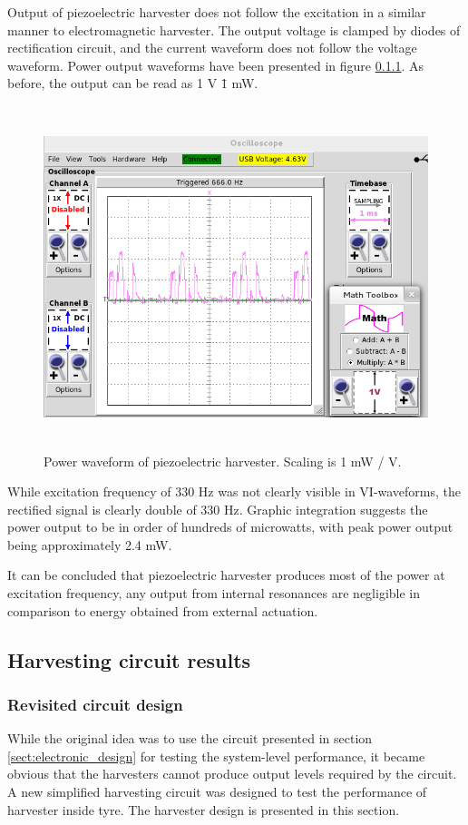 Output of piezoelectric harvester does not follow the excitation in a similar manner to electromagnetic harvester. The output voltage is clamped by diodes of rectification circuit, and the current waveform does not follow the voltage waveform. Power output waveforms have been presented in figure \ref{}. As before, the output can be read as 1 V \= 1 mW. 

\begin{figure}[htb]
\begin{center}
\includegraphics[height=10cm]{images/own_measurement/generator_shaker/piezo_td_power_330hz_2_3.png}
\end{center}
\caption{\label{fig:piezo_td_vi} Power waveform of piezoelectric harvester. Scaling is 1 mW / V.}
\end{figure}

While excitation frequency of 330 Hz was not clearly visible in VI-waveforms, the rectified signal is clearly double of 330 Hz. Graphic integration suggests the power output to be in order of hundreds of microwatts, with peak power output being approximately 2.4 mW. 

It can be concluded that piezoelectric harvester produces most of the power at excitation frequency, any output from internal resonances are negligible in comparison to energy obtained from external actuation.

\subsection{Harvesting circuit results}
\subsubsection{Revisited circuit design}
While the original idea was to use the circuit presented in section \ref{sect:electronic_design} for testing the system-level performance, it became obvious that the harvesters cannot produce output levels required by the circuit. A new simplified harvesting circuit was designed to test the performance of harvester inside tyre. The harvester design is presented in this section.

